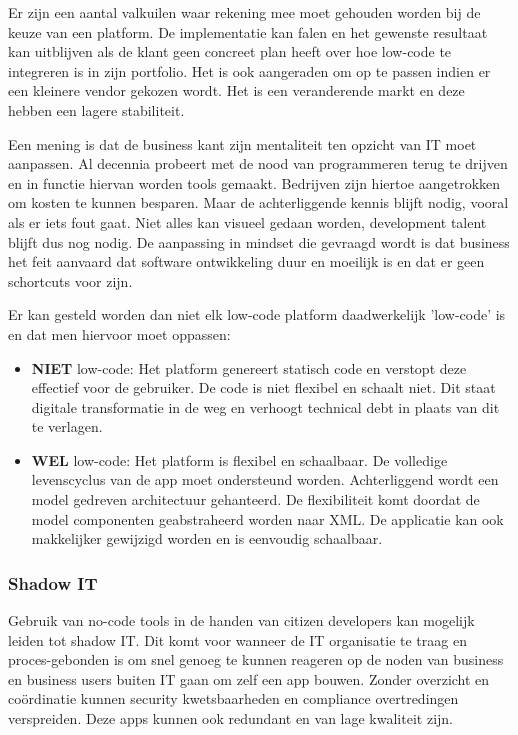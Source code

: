 Er zijn een aantal valkuilen waar rekening mee moet gehouden worden bij de keuze van een platform. De implementatie kan falen en het gewenste resultaat kan uitblijven als de klant geen concreet plan heeft over hoe low-code te integreren is in zijn portfolio. Het is ook aangeraden om op te passen indien er een kleinere vendor gekozen wordt. Het is een veranderende markt en deze hebben een lagere stabiliteit. \autocite{Richardson2016}

Een mening is dat de business kant zijn mentaliteit ten opzicht van IT moet aanpassen. Al decennia probeert met de nood van programmeren terug te drijven en in functie hiervan worden tools gemaakt. Bedrijven zijn hiertoe aangetrokken om kosten te kunnen besparen. Maar de achterliggende kennis blijft nodig, vooral als er iets fout gaat. Niet alles kan visueel gedaan worden, development talent blijft dus nog nodig. De aanpassing in mindset die gevraagd wordt is dat business het feit aanvaard dat software ontwikkeling duur en moeilijk is en dat er geen schortcuts voor zijn. \autocite{Reselman2018}

Er kan gesteld worden dan niet elk low-code platform daadwerkelijk 'low-code' is en dat men hiervoor moet oppassen:
\begin{itemize}
    \item \textbf{NIET} low-code: Het platform genereert statisch code en verstopt deze effectief voor de gebruiker. De code is niet flexibel en schaalt niet. Dit staat digitale transformatie in de weg en verhoogt technical debt in plaats van dit te verlagen.
    \item \textbf{WEL} low-code: Het platform is flexibel en schaalbaar. De volledige levenscyclus van de app moet ondersteund worden. Achterliggend wordt een model gedreven architectuur gehanteerd. De flexibiliteit komt doordat de model componenten geabstraheerd worden naar XML. De applicatie kan ook makkelijker gewijzigd worden en is eenvoudig schaalbaar.
\end{itemize} \autocite{Shiah2018}

\subsubsection{Shadow IT}

Gebruik van no-code tools in de handen van citizen developers kan mogelijk leiden tot shadow IT. Dit komt voor wanneer de IT organisatie te traag en proces-gebonden is om snel genoeg te kunnen reageren op de noden van business en business users buiten IT gaan om zelf een app bouwen. Zonder overzicht en coördinatie kunnen security kwetsbaarheden en compliance overtredingen verspreiden. Deze apps kunnen ook redundant en van lage kwaliteit zijn. \autocite{Bloomberg2017}

